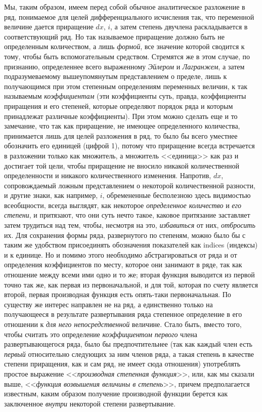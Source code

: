 Мы, таким образом, имеем перед собой обычное аналитическое разложение в ряд,
понимаемое для целей дифференциального исчисления так, что переменной
величине дается приращение $dx$,
$i$, а затем степень двучлена раскладывается в
соответствующий ряд. Но так называемое приращение должно быть не
определенным количеством, а лишь {\em формой}, все
значение которой сводится к тому, чтобы быть вспомогательным средством.
Стремятся же в этом случае, по признанию, определеннее всего выраженному
{\em Эйлером} и {\em Лагранжем}, а
затем подразумеваемому вышеупомянутым представлением о пределе, лишь к
получающимся при этом степенным определениям переменных величин, к так
называемым {\em коэффициентам} (эти коэффициенты суть,
правда, коэффициенты приращения и его степеней, которые определяют порядок
ряда и которым принадлежат различные коэффициенты). При этом можно сделать
еще и то замечание, что так как приращение, не имеющее определенного
количества, принимается лишь для целей разложения в ряд, то было бы всего
уместнее обозначить его единицей (цифрой 1), потому что приращение всегда
встречается в разложении только как множитель, а множитель <<единица>> как
раз и достигает той цели, чтобы приращение не вносило никакой
количественной определенности и никакого количественного изменения.
Напротив, $dx$, сопровождаемый ложным
представлением о некоторой количественной разности, и другие знаки, как
например, $i$, обремененные бесполезною здесь
видимостью всеобщности, всегда выглядят, как некоторое
{\em определенное количество} и
{\em его степени}, и притязают, что они суть нечто
такое, каковое притязание заставляет затем трудиться над тем, чтобы,
несмотря на это, {\em избавиться} от них,
{\em отбросить} их. Для сохранения формы ряда,
развернутого по степеням, можно было бы с таким же удобством присоединять
обозначения показателей как indices (индексы) и к единице. Но и помимо
этого необходимо абстрагироваться от ряда и от определения коэффициентов по
месту, которое они занимают в ряде, так как отношение между всеми ими одно
и то же; вторая функция выводится из первой точно так же, как первая из
первоначальной, и для той, которая по счету является второй, первая
производная функция есть опять-таки первоначальная. По существу же интерес
направлен не на ряд, а единственно только на получающееся в результате
развертывания ряда степенное определение в его отношении к
{\em для него непосредственной} величине. Стало быть,
вместо того, чтобы считать это определение
{\em коэффициентом первого} члена развертывающегося
ряда, было бы предпочтительнее (так как каждый член есть
{\em первый} относительно следующих за ним членов ряда,
а такая степень в качестве степени приращения, как и сам ряд, не имеет сюда
отношения) употреблять простое выражение
<<{\em производная степенная функция}>>, или, как мы
сказали выше, <<{\em функция возвышения величины в
степень}>>, причем предполагается известным, каким образом получение
производной функции берется как заключенное
{\em внутри} некоторой степени развертывание.

